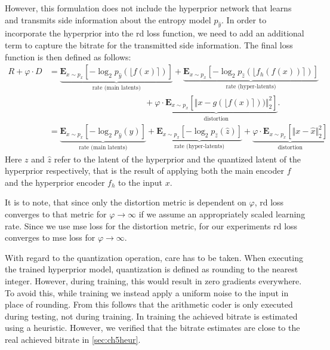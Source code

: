 However, this formulation does not include the hyperprior network that learns and transmits side information about the entropy model $p_{\hat{y}}$. In order to incorporate the hyperprior into the \ac{rd} loss function, we need to add an additional term to capture the bitrate for the transmitted side information. The final loss function is then defined as follows:
\begin{align}
R + \varphi \cdot D &= \underbrace{\mathbf{E}_{x\sim p_x} [ -\log_2 p_{\hat{y}}(\lfloor f(x)\rceil)]}_\text{rate (main latents)} + 
\underbrace{\mathbf{E}_{x\sim p_x} [ -\log_2 p_{\hat{z}}(\lfloor f_h(f(x))\rceil)]}_\text{rate (hyper-latents)} \nonumber\\
&\qquad\qquad\qquad\qquad\qquad\quad\:\: + \underbrace{\varphi \cdot\mathbf{E}_{x\sim p_x} [\Vert x - g(\lfloor f(x)\rceil))\Vert^2_2]}_\text{distortion}.\nonumber\\
&=\underbrace{\mathbf{E}_{x\sim p_x} [ -\log_2 p_{\hat{y}}(\hat{y})]}_\text{rate (main latents)} + 
\underbrace{\mathbf{E}_{x\sim p_x} [ -\log_2 p_{\hat{z}}(\hat{z})]}_\text{rate (hyper-latents)} + \underbrace{\varphi \cdot\mathbf{E}_{x\sim p_x} [\Vert x - \hat{x}\Vert^2_2]}_\text{distortion}
\end{align}
Here $z$ and $\hat{z}$ refer to the latent of the hyperprior and the quantized latent of the hyperprior respectively, that is the result of applying both the main encoder $f$ and the hyperprior encoder $f_h$ to the input $x$.

It is to note, that since only the distortion metric is dependent on $\varphi$, \ac{rd} loss converges to that metric for $\varphi\rightarrow\infty$ if we assume an appropriately scaled learning rate. Since we use \ac{mse} loss for the distortion metric, for our experiments \ac{rd} loss converges to \ac{mse} loss for $\varphi\rightarrow\infty$.

With regard to the quantization operation, care has to be taken. When executing the trained hyperprior model, quantization is defined as rounding to the nearest integer. However, during training, this would result in zero gradients everywhere. To avoid this, while training we instead apply a uniform noise to the input in place of rounding. From this follows that the arithmetic coder is only executed during testing, not during training. In training the achieved bitrate is estimated using a heuristic. However, we verified that the bitrate estimates are close to the real achieved bitrate in \autoref{sec:ch5heur}.

